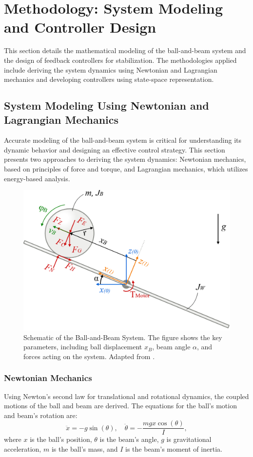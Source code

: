 \documentclass[conference]{IEEEtran}
\begin{document}
\section{Methodology: System Modeling and Controller Design}
\label{sec:methodology}

This section details the mathematical modeling of the ball-and-beam system and the design of feedback controllers for stabilization. The methodologies applied include deriving the system dynamics using Newtonian and Lagrangian mechanics and developing controllers using state-space representation.

\subsection{System Modeling Using Newtonian and Lagrangian Mechanics}
\label{subsec:modeling}
Accurate modeling of the ball-and-beam system is critical for understanding its dynamic behavior and designing an effective control strategy. This section presents two approaches to deriving the system dynamics: Newtonian mechanics, based on principles of force and torque, and Lagrangian mechanics, which utilizes energy-based analysis.

\begin{figure}[H]
    \centering
    \includegraphics[width=0.8\linewidth]{Figures/system_diag_wiki_right.PNG}
    \caption{Schematic of the Ball-and-Beam System. The figure shows the key parameters, including ball displacement \(x_B\), beam angle \(\alpha\), and forces acting on the system. Adapted from \cite{mager2015}.}
    \label{fig:ball_beam_schematic}
\end{figure}

\subsubsection{Newtonian Mechanics}
\label{subsubsec:model_newtonian}
Using Newton's second law for translational and rotational dynamics, the coupled motions of the ball and beam are derived. The equations for the ball's motion and beam's rotation are:
\begin{equation}
\ddot{x} = -g \sin(\theta), \quad \ddot{\theta} = -\frac{m g x \cos(\theta)}{I},
\end{equation}
where \(x\) is the ball's position, \(\theta\) is the beam's angle, \(g\) is gravitational acceleration, \(m\) is the ball's mass, and \(I\) is the beam's moment of inertia.
\end{document}
